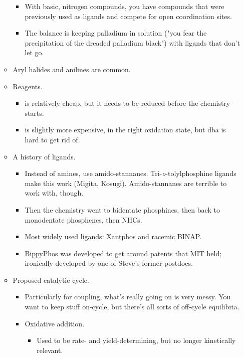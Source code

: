 \documentclass[../notes.tex]{subfiles}
\begin{document}
\begin{itemize}
\begin{itemize}
        \begin{itemize}
            \item With basic, nitrogen compounds, you have compounds that were previously used as ligands and compete for open coordination sites.
            \item The balance is keeping palladium in solution ("you fear the precipitation of the dreaded palladium black") with ligands that don't let go.
        \end{itemize}
        \item Aryl halides and anilines are common.
        \item Reagents.
        \begin{itemize}
            \item {} is relatively cheap, but it needs to be reduced before the chemistry starts.
            \item {} is slightly more expensive, in the right oxidation state, but dba is hard to get rid of.
        \end{itemize}
        \item A history of ligands.
        \begin{itemize}
            \item Instead of amines, use amido-stannanes. Tri-\emph{o}-tolylphosphine ligands make this work (Migita, Kosugi). Amido-stannanes are terrible to work with, though.
            \item Then the chemistry went to bidentate phosphines, then back to monodentate phosphenes, then NHCs.
            \item Most widely used ligands: Xantphos and racemic BINAP.
            \item BippyPhos was developed to get around patents that MIT held; ironically developed by one of Steve's former postdocs.
        \end{itemize}
        \item Proposed catalytic cycle.
        \begin{itemize}
            \item Particularly for  coupling, what's really going on is very messy. You want to keep stuff on-cycle, but there's all sorts of off-cycle equilibria.
            \item Oxidative addition.
            \begin{itemize}
                \item Used to be rate- and yield-determining, but no longer kinetically relevant.

\end{itemize}
\end{itemize}
\end{itemize}
\end{itemize}
\end{document}
